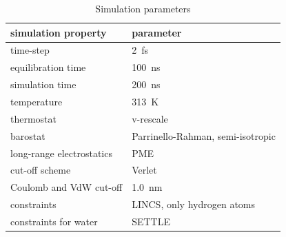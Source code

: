 \documentclass[aip,jcp,twocolumn]{revtex4}
\begin{document}
\begin{table}[btp]
  \caption{Simulation parameters}
  \label{tbl:mdpar}
  \begin{tabular}{ll}
    simulation property & parameter   \\
    \hline
    time-step           & 2~fs         \\
    equilibration time  & 100~ns  \\
    simulation time     & 200~ns  \\
    temperature         & 313~K       \\
    thermostat          & v-rescale  \cite{bussi07}   \\
    barostat            & Parrinello-Rahman, semi-isotropic \cite{parrinello81} \\
    long-range electrostatics & PME  \cite{darden93}  \\
    cut-off scheme      & Verlet \cite{Pall13}      \\
    Coulomb and VdW cut-off & 1.0~nm \\
    constraints         & LINCS, only hydrogen atoms \cite{hess97} \\
    constraints for water & SETTLE  \cite{miyamoto92} \\
    \hline
  \end{tabular}
\end{table}






\listoftodos
\end{document}
